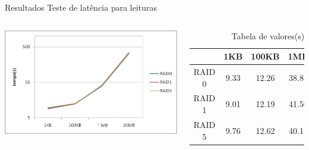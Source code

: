 
\begin{frame}{Resultados}
	Teste de latência para leituras
	\begin{columns}
		
		\includegraphics[width=\textwidth]{imagens/latencia_leitura}
		
		
	
		\begin{table}
			\caption{Tabela de valores(s)}
			\tiny
			\begin{tabular}{|c|c|c|c|c|} \hline
				& 1KB  & 100KB & 1MB   & 10MB  \\ \hline
				RAID 0	& 9.33 & 12.26 & 38.84 & 324.73\\ \hline
				RAID 1	& 9.01 & 12.19 & 41.50 & 348.15\\ \hline
				RAID 5	& 9.76 & 12.62 & 40.11 & 326.75\\ \hline
				
				
			\end{tabular}
		\end{table}
			
		
		
	\end{columns}
\end{frame}

